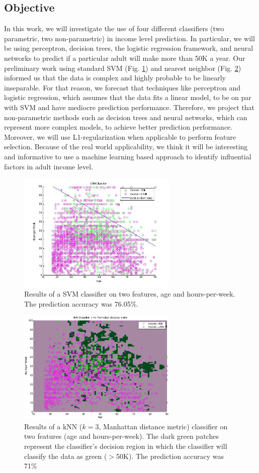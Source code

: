 \documentclass[conference]{IEEEtran}
\begin{document}
\subsection{Objective}
In this work, we will investigate the use of four different classifiers (two parametric, two non-parametric) in income level prediction. In particular, we will be using perceptron, decision trees, the logistic regression framework, and neural networks to predict if a particular adult will make more than 50K a year. Our preliminary work using standard SVM (Fig. \ref{fig:svm}) and nearest neighbor (Fig. \ref{fig:nearestNeighbor}) informed us that the data is complex and highly probable to be linearly inseparable. For that reason, we forecast that techniques like perceptron and logistic regression, which assumes that the data fits a linear model, to be on par with SVM and have mediocre prediction performance. Therefore, we project that non-parametric methods such as decision trees and neural networks, which can represent more complex models, to achieve better prediction performance. \\
Moreover, we will use L1-regularization when applicable to perform feature selection. Because of the real world applicability, we think it will be interesting and informative to use a machine learning based approach to identify influential factors in adult income level.
\begin{figure}[h!]
\centering
\includegraphics[width=3in]{svm.jpg}
\caption{Results of a SVM classifier on two features, age and hours-per-week. The prediction accuracy was 76.05\%.}
\label{fig:svm}
\end{figure}
\begin{figure}[h!]
\centering
\includegraphics[width=3in]{nearestNeighbor.eps}
\caption{Results of a kNN ($k=3$, Manhattan distance metric) classifier on two features (age and hours-per-week). The dark green patches represent the classifier’s decision region in which the classifier will classify the data as green ($>$50K). The prediction accuracy was 71\%}
\label{fig:nearestNeighbor}
\end{figure}
\end{document}
